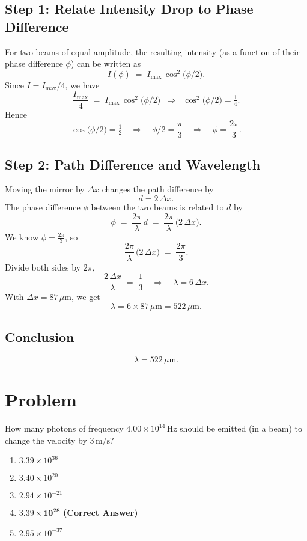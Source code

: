 \documentclass[12pt]{article}
\theoremstyle{definition} %
\theoremstyle{plain} %
\begin{document}
\subsection*{Step 1: Relate Intensity Drop to Phase Difference}
For two beams of equal amplitude, the resulting intensity 
(as a function of their phase difference $\phi$) can be written as
\[
  I(\phi) \;=\; I_{\max}\,\cos^2\!\bigl(\phi/2\bigr).
\]
Since $I = I_{\max}/4$, we have
\[
  \frac{I_{\max}}{4} \;=\; I_{\max}\,\cos^2\!\bigl(\phi/2\bigr)
  \;\;\Longrightarrow\;\; \cos^2\!\bigl(\phi/2\bigr) = \tfrac14.
\]
Hence 
\[
  \cos\!\bigl(\phi/2\bigr) = \tfrac12
  \quad\Longrightarrow\quad 
  \phi/2 = \frac{\pi}{3}
  \quad\Longrightarrow\quad 
  \phi = \frac{2\pi}{3}.
\]

\subsection*{Step 2: Path Difference and Wavelength}
Moving the mirror by $\Delta x$ changes the path difference by 
\[
  d = 2\,\Delta x.
\]
The phase difference $\phi$ between the two beams is related to $d$ by
\[
  \phi \;=\; \frac{2\pi}{\lambda}\,d 
  \;=\; \frac{2\pi}{\lambda}\,\bigl(2\,\Delta x\bigr).
\]
We know $\phi = \tfrac{2\pi}{3}$, so
\[
  \frac{2\pi}{\lambda} \,\bigl(2\,\Delta x\bigr)
  \;=\; \frac{2\pi}{3}.
\]
Divide both sides by $2\pi$,
\[
  \frac{2\,\Delta x}{\lambda}
  \;=\; \frac{1}{3}
  \quad\Longrightarrow\quad
  \lambda = 6\,\Delta x.
\]
With $\Delta x = 87\,\mu\mathrm{m}$, we get
\[
  \lambda = 6 \times 87\,\mu\mathrm{m}
          = 522\,\mu\mathrm{m}.
\]

\subsection*{Conclusion}
\[
  \boxed{\lambda = 522\,\mu\mathrm{m}.}
\]


\section*{Problem}

How many photons of frequency $4.00 \times 10^{14} \, \text{Hz}$ should be emitted (in a beam) to change the velocity by $3 \, \text{m/s}$?

\begin{enumerate}
    \item $3.39 \times 10^{36}$
    \item $3.40 \times 10^{20}$
    \item $2.94 \times 10^{-21}$
    \item $\mathbf{3.39 \times 10^{28}}$ \quad \textbf{(Correct Answer)}
    \item $2.95 \times 10^{-37}$
\end{enumerate}
\end{document}
